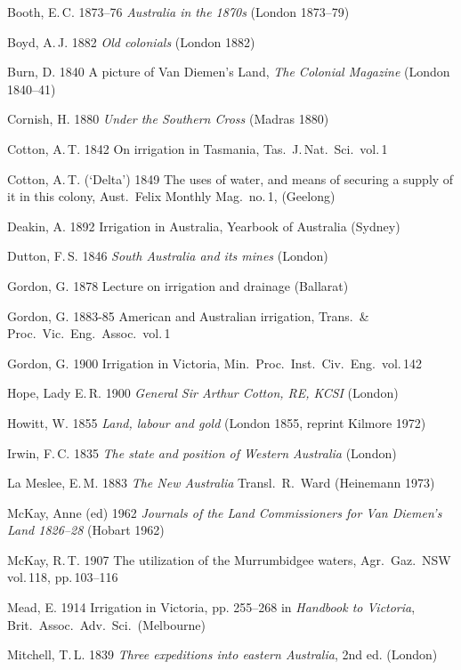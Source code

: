 Booth, E.\,C. 1873--76 \textsl{Australia in the 1870s} (London
1873--79)

Boyd, A.\,J. 1882 \textsl{Old colonials} (London 1882)

Burn, D. 1840 A picture of Van Diemen's Land, \textsl{The Colonial
Magazine} (London 1840--41)

Cornish, H. 1880 \textsl{Under the Southern Cross} (Madras 1880)

Cotton, A.\,T. 1842 On irrigation in Tasmania, Tas.\
J.\,Nat.\ Sci.\ vol.\,1

Cotton, A.\,T. (`Delta') 1849 The uses of water, and means of securing
a supply of it in this colony, Aust.\ Felix Monthly Mag.\ no.\,1,
(Geelong)

Deakin, A.  1892 Irrigation in Australia, Yearbook of Australia
(Sydney)

Dutton, F.\,S. 1846 \textsl{South Australia and its mines} (London)

Gordon, G. 1878 Lecture on irrigation and drainage (Ballarat)

Gordon, G. 1883-85 American and Australian irrigation, Trans.\ \&
Proc.\ Vic.\ Eng.\ Assoc.\ vol.\,1

Gordon, G. 1900 Irrigation in Victoria, Min.\ Proc.\ Inst.\ Civ.\
Eng.\ vol.\,142

Hope, Lady E.\,R. 1900 \textsl{General Sir Arthur Cotton, RE, KCSI}
(London)

Howitt, W. 1855 \textsl{Land, labour and gold} (London 1855, reprint
Kilmore 1972)

Irwin, F.\,C. 1835 \textsl{The state and position of Western
Australia} (London)

La Meslee, E.\,M. 1883 \textsl{The New Australia} Transl.\ R.~Ward
(Heinemann 1973)

McKay, Anne (ed) 1962 \textsl{Journals of the Land Commissioners for
Van Diemen's Land 1826--28} (Hobart 1962)

McKay, R.\,T. 1907 The utilization of the Murrumbidgee waters, Agr.\
Gaz.\ NSW vol.\,118, pp.\,103--116

Mead, E. 1914 Irrigation in Victoria, pp. 255--268 in \textsl{Handbook
to Victoria}, Brit.\ Assoc.\ Adv.\ Sci.\ (Melbourne)

\refitem
Mitchell, T.\,L. 1839 \textsl{Three expeditions into eastern
Australia}, 2nd ed. (London)


